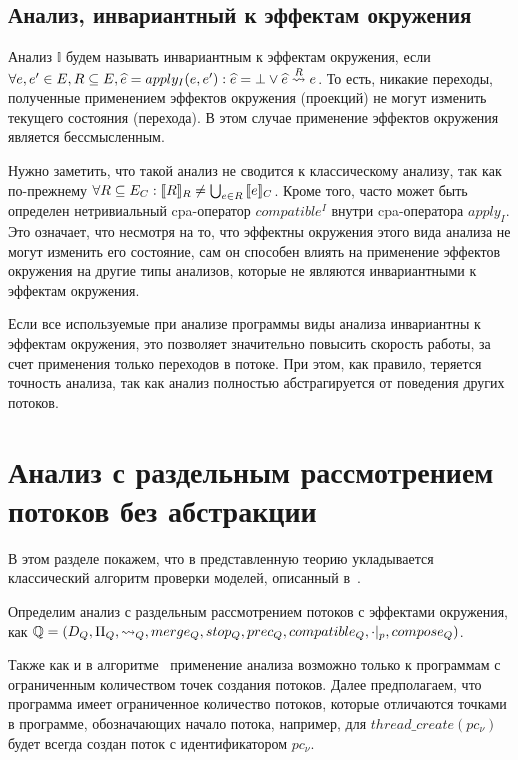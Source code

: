 \subsection{Анализ, инвариантный к эффектам окружения}
\label{sect_inv_analysis}

Анализ $\mathbb{I}$ будем называть инвариантным к эффектам окружения, если $\forall e, e' \in E, R \subseteq E, \widehat{e} = apply_I(e, e'): \widehat{e} = \bot \lor \widehat{e} \stackrel{R}{\leadsto} e$.
То есть, никакие переходы, полученные применением эффектов окружения (проекций) не могут изменить текущего состояния (перехода). 
В этом случае применение эффектов окружения является бессмысленным.

Нужно заметить, что такой анализ не сводится к классическому анализу, так как по-прежнему $\forall R\subseteq E_C: [\![ R ]\!]_R \neq \bigcup_{e\in R}{[\![ e ]\!]_C}$.
Кроме того, часто может быть определен нетривиальный cpa-оператор $compatible^{I}$ внутри cpa-оператора $apply_I$. 
Это означает, что несмотря на то, что эффектны окружения этого вида анализа не могут изменить его состояние, сам он способен влиять на применение эффектов окружения на другие типы анализов, которые не являются инвариантными к эффектам окружения.

Если все используемые при анализе программы виды анализа инвариантны к эффектам окружения, это позволяет значительно повысить скорость работы, за счет применения только переходов в потоке.
При этом, как правило, теряется точность анализа, так как анализ полностью абстрагируется от поведения других потоков.

\section{Анализ с раздельным рассмотрением потоков без абстракции}

В этом разделе покажем, что в представленную теорию укладывается классический алгоритм проверки моделей, описанный в~\cite{ThreadModular03}.

Определим анализ с раздельным рассмотрением потоков с эффектами окружения, как
$\mathbb{Q}=(D_{Q}, \Pi_{Q}, \leadsto_{Q}, merge_{Q}, stop_{Q}, prec_{Q}, compatible_{Q}, \cdot|_p, compose_Q)$.

Также как и в алгоритме~\cite{ThreadModular03} применение анализа возможно только к программам с ограниченным количеством точек создания потоков. Далее предполагаем, что программа имеет ограниченное количество потоков, которые отличаются точками в программе, обозначающих начало потока, например, для $thread\_create(pc_\nu)$ будет всегда создан поток с идентификатором $pc_\nu$.

